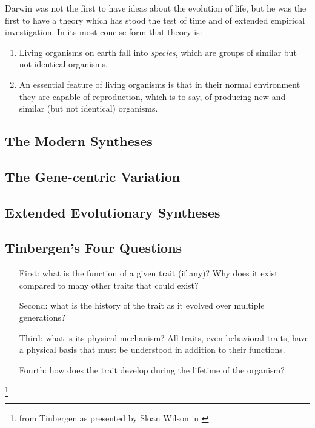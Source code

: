 \documentclass[10pt,titlepage]{article}
\begin{document}
Darwin was not the first to have ideas about the evolution of life, but he was the first to have a theory which has stood the test of time and of extended empirical investigation.
In its most concise form that theory is:
\begin{enumerate}
\item Living organisms on earth fall into \emph{species}, which are groups of similar but not identical organisms.
\item An essential feature of living organisms is that in their normal environment they are capable of reproduction, which is to say, of producing new and similar (but not identical) organisms.
\end{enumerate}

  \subsection{The Modern Syntheses}

  \subsection{The Gene-centric Variation}

  \subsection{Extended Evolutionary Syntheses}

  \subsection{Tinbergen's Four Questions}

  \begin{itemize}
  \item[First:] what is the function of a given trait (if any)? Why does it exist compared to many other traits that could exist?
  \item[Second:] what is the history of the trait as it evolved over multiple generations?
  \item [Third:] what is its physical mechanism? All traits, even behavioral traits, have a physical basis that must be understood in addition to their functions.
    \item [Fourth:] how does the trait develop during the lifetime of the organism?
  \end{itemize}
  \footnote{from Tinbergen \cite{tinbergen-oame} as presented by Sloan Wilson in \cite{wilson-tvl}}
  
\end{document}
